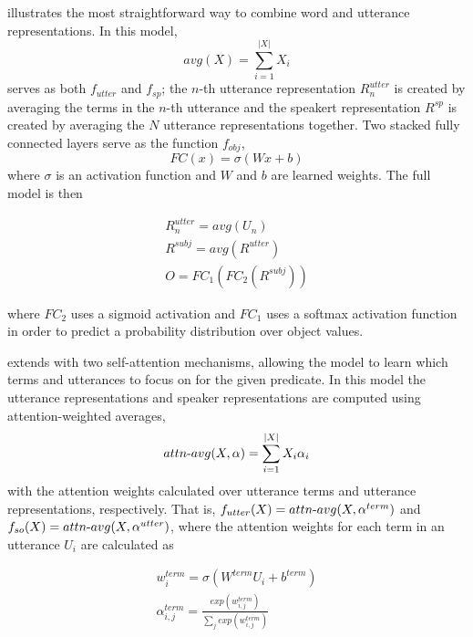  illustrates the most straightforward way to combine word and utterance representations.
In this model,
\begin{equation}
avg(X) = \sum_{i=1}^{|X|} X_i
\end{equation}
serves as both $f_{utter} $ and $f_{sp}$; the $n$-th utterance representation $R^{utter}_n$ is created by averaging the terms in the $n$-th utterance and the speakert representation $R^{sp}$ is created by averaging the $N$ utterance representations together. Two stacked fully connected layers serve as the function $f_{obj}$,
\begin{equation}
FC(x) = \sigma(Wx+b)
\end{equation}
where $\sigma$ is an activation function and $W$ and $b$ are learned weights.
The full  model is then
\begin{spreadlines}{10pt}  
\begin{gather}
R^{utter}_n = avg(U_n) \\
R^{subj} = avg(R^{utter}) \\
O = FC_1(FC_2(R^{subj}))
\end{gather}
\end{spreadlines}

where $FC_2$ uses a sigmoid activation and $FC_1$ uses a softmax activation function in order to predict a probability distribution over object values.

 extends  with two self-attention mechanisms, allowing the model to learn which terms and utterances to focus on for the given predicate. In this model the utterance representations and speaker representations are computed using attention-weighted averages,
\begin{equation}
attn{\text -}avg(X, \alpha) = \sum_{i=1}^{|X|} X_i \alpha_i
\end{equation}
with the attention weights calculated over utterance terms and utterance representations, respectively.
That is, $f_{utter}(X)=attn{\text -}avg(X, \alpha^{term})$ and $f_{so}(X)=attn{\text -}avg(X, \alpha^{utter})$, where
the attention weights for each term in an utterance $U_i$ are calculated as
\begin{spreadlines}{15pt}  
\begin{gather} \label{eq:attn1}
w^{term}_i = \sigma(W^{term} U_i + b^{term}) \\ \label{eq:attn2} 
\alpha^{term}_{i,j} = \frac{exp(w^{term}_{i,j})}{\sum_j exp(w^{term}_{i,j})}
\end{gather}
\end{spreadlines}

